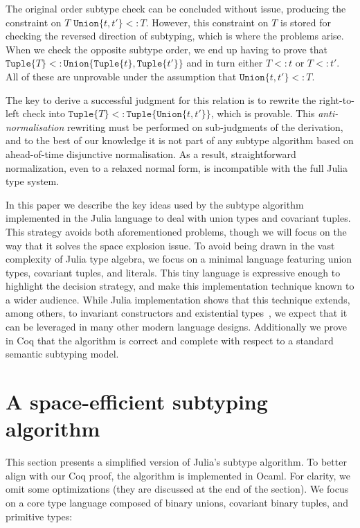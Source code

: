 \documentclass[a4paper,english]{lipics-v2019}
\newcommand{\xt}[1]{\texttt{#1}}
\newcommand{\union}[2]{\xt{Union\{}#1,#2\xt{\}}}
\newcommand{\tuple}[1]{\xt{Tuple\{}#1\xt{\}}}
\begin{document}
The original order subtype check can be concluded without issue, producing the
constraint on $T$ {\small$\union{t}{t'} <: T$}. However, this constraint on $T$ is 
stored for checking the reversed direction of subtyping, which is where the problems
arise. When we check the opposite subtype order, we end up having to prove that {\small$\tuple{T}<:\union{\tuple{t}}{\tuple{t'}}$} and in turn
either {\small$T<:t$} or {\small$T<:t'$}. All of these are unprovable
under the assumption that {\small$\union{t}{t'} <: T$}.

The key to derive a successful judgment for this relation is to rewrite the
right-to-left check into {\small$\tuple{T}<:\tuple{\union{t}{t'}}$}, which is
provable. This \emph{anti-normalisation} rewriting must be performed on
sub-judgments of the derivation, and to the best of our knowledge it is not
part of any subtype algorithm based on ahead-of-time disjunctive
normalisation. As a result, straightforward normalization, even to a relaxed
normal form, is incompatible with the full Julia type system.

In this paper we describe the key ideas used by the subtype algorithm
implemented in the Julia language to deal with union types and covariant
tuples. This strategy avoids both aforementioned problems, though we will
focus  on the way that it solves the space explosion issue. To avoid being
drawn in the vast complexity of Julia type algebra, we focus on a minimal
language featuring union types, covariant tuples, and literals. This tiny
language is expressive enough to highlight the decision strategy, and make
this implementation technique known to a wider audience.  While Julia
implementation shows that this technique extends, among others, to invariant
constructors and existential types~\cite{DBLP:NardelliBPCBV18}, we expect that
it can be leveraged in many other modern language designs. Additionally we
prove in Coq that the algorithm is correct and complete with respect to a
standard semantic subtyping model.


\section{A space-efficient subtyping algorithm}

This section presents a simplified version of Julia's subtype algorithm.  To
better align with our Coq proof, the algorithm is implemented in Ocaml.  For
clarity, we omit some optimizations (they are discussed at the end of the
section). We focus on a core type language composed of binary unions,
covariant binary tuples, and primitive types:
\end{document}

